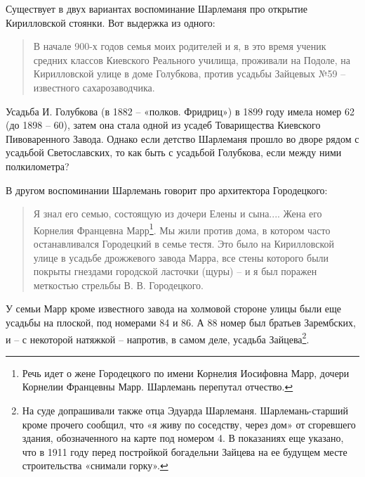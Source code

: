 
Существует в двух вариантах воспоминание Шарлеманя про открытие Кирилловской стоянки. Вот выдержка из одного:

\begin{quotation}
В начале 900-х годов семья моих родителей и я, в это время ученик средних классов Киевского Реального училища, проживали на Подоле, на Кирилловской улице в доме Голубкова, против усадьбы Зайцевых №59 – известного сахарозаводчика.
\end{quotation}

Усадьба И. Голубкова (в 1882 – «полков. Фридриц») в 1899 году имела номер 62 (до 1898 – 60), затем она стала одной из усадеб Товарищества Киевского Пивоваренного Завода. Однако если детство Шарлеманя прошло во дворе рядом с усадьбой Светославских, то как быть с усадьбой Голубкова, если между ними полкилометра?




В другом воспоминании Шарлемань говорит про архитектора Городецкого:

\begin{quotation}
Я знал его семью, состоящую из дочери Елены и сына.... Жена его Корнелия Францевна Марр\footnote{Речь идет о жене Городецкого по имени Корнелия Иосифовна Марр, дочери Корнелии Францевны Марр. Шарлемань перепутал отчество.}. Мы жили против дома, в котором часто останавливался Городецкий в семье тестя. Это было на Кирилловской улице в усадьбе дрожжевого завода Марра, все стены которого были покрыты гнездами городской ласточки (щуры) – и я был поражен меткостью стрельбы В. В. Городецкого.
\end{quotation}

У семьи Марр кроме известного завода на холмовой стороне улицы были еще усадьбы на плоской, под номерами 84 и 86. А 88 номер был братьев Зарембских, и – с некоторой натяжкой – напротив, в самом деле, усадьба Зайцева\footnote{На суде допрашивали также отца Эдуарда Шарлеманя. Шарлемань-старший кроме прочего сообщил, что «я живу по соседству, через дом» от сгоревшего здания, обозначенного на карте под номером 4. В показаниях еще указано, что в 1911 году перед постройкой богадельни Зайцева на ее будущем месте строительства «снимали горку».}.

